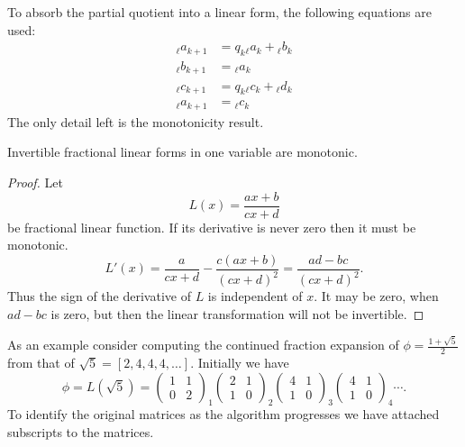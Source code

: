 To absorb the partial quotient into a linear form, the following
equations are used:
\begin{equation}\label{CF:One:Absorb:Eq}
\begin {aligned}
  {}_{\ell}a_{k+1} & = q_k {}_{\ell}a_k + {}_{\ell}b_k \\
  {}_{\ell}b_{k+1} & = {}_{\ell}a_k \\
  {}_{\ell}c_{k+1} & = q_k {}_{\ell}c_k +{}_{\ell}d_k\\
  {}_{\ell}a_{k+1} & = {}_{\ell}c_k
\end{aligned}
\end{equation}
The only detail left is the monotonicity result.

\begin{proposition}
\label{CF:Linear:Monotonic}  Invertible fractional linear forms in
one variable are monotonic.
\end{proposition}

\begin{proof}
Let 
\[
L(x) = \frac{a x + b}{c x +d}
\]
be fractional linear function.  If its derivative is never zero then
it must be monotonic.
\[
L'(x) = \frac{a}{c x +d } - \frac{c (a x + b)}{(cx+d)^2}
  = \frac{ad - bc}{(cx+d)^2}.
\]
Thus the sign of the derivative of $L$ is independent of $x$.  It may
be zero, when $ad-bc$ is zero, but then the linear transformation will
not be invertible.
\end{proof}

As an example consider computing the continued fraction expansion of
$\phi = \frac{1 + \sqrt{5}}{2}$ from that of $\sqrt{5} = [2, 4, 4, 4, \ldots]$.
Initially we have
\[
\phi = L(\sqrt{5}) = 
\begin{pmatrix}1 & 1\\ 0 & 2 \end{pmatrix}_1 \begin{pmatrix}2 & 1 \\ 1 & 0 \end{pmatrix}_2
  \begin{pmatrix}4 & 1 \\ 1 & 0 \end{pmatrix}_3 \begin{pmatrix}4 & 1 \\ 1 & 0 \end{pmatrix}_4 \cdots.
\]
To identify the original matrices as the algorithm progresses we have
attached subscripts to the matrices.

